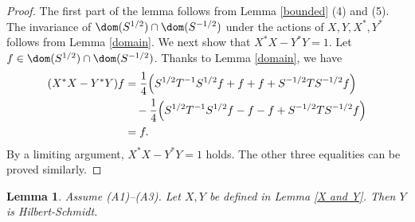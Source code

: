 \documentclass[12pt,draft]{article}
\theoremstyle{plain}
\newtheorem{lem}[theorem]{\bf Lemma}
\numberwithin{equation}{section}
\theoremstyle{remark}
\begin{document}
\begin{proof}
The first part of the lemma follows from Lemma \ref{bounded} (4) and (5).
The invariance of $\dom(S^{1/2})\cap\dom(S^{-1/2})$ under the actions of $X, Y, X^*, Y^*$ follows from Lemma \ref{domain}.
We next show that $X^*X-Y^*Y=1$.
Let $f\in\dom(S^{1/2})\cap\dom(S^{-1/2})$.
Thanks to Lemma \ref{domain}, we have
\begin{align*}
 (X^*X-Y^*Y)f
 &= \frac{1}{4}\Bigl(S^{1/2}T^{-1}S^{1/2}f+f+f+S^{-1/2}TS^{-1/2}f\Bigr)\\
 &  \quad -\frac{1}{4}\Bigl(S^{1/2}T^{-1}S^{1/2}f-f-f+S^{-1/2}TS^{-1/2}f\Bigr)\\
 &= f.
\end{align*}
By a limiting argument, $X^*X-Y^*Y=1$ holds.
The other three equalities can be proved similarly.
\end{proof}

\begin{lem}\label{Y is HS}
Assume (A1)--(A3). Let $X,Y$ be defined in Lemma \ref{X and Y}.
Then $Y$ is Hilbert-Schmidt.
\end{lem}
\end{document}
